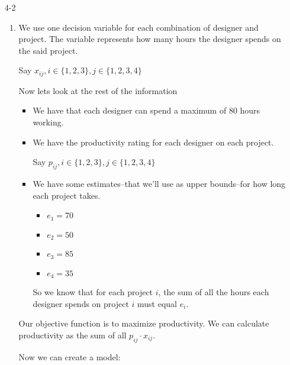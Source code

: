 \documentclass[12pt,letterpaper]{article}
\begin{document}
\begin{enumerate}
\begin{enumerate}
          

        \item
        \item
      \end{enumerate}

    \item [4-2]
      \begin{enumerate}
        \item
          We use one decision variable for each combination of designer and project.
          The variable represents how many hours the designer spends on the said project.

          Say $x_{ij}, i \in \{1, 2, 3\}, j \in \{1, 2, 3, 4\}$

          Now lets look at the rest of the information

          \begin{itemize}
            \item We have that each designer can spend a maximum of 80 hours working.
            \item
              We have the productivity rating for each designer on each project.

              Say $p_{ij}, i \in \{1, 2, 3\}, j \in \{1, 2, 3, 4\}$
            \item
              We have some estimates--that we'll use as upper bounds--for how long each project takes.
              \begin{itemize}
                \item $e_1 = 70$
                \item $e_2 = 50$
                \item $e_3 = 85$
                \item $e_4 = 35$
              \end{itemize}
              So we know that for each project $i$,
              the sum of all the hours each designer spends on project $i$ must equal $e_i$.
          \end{itemize}

          Our objective function is to maximize productivity.
          We can calculate productivity as the sum of all $p_{ij} \cdot x_{ij}$.

          Now we can create a model:


\end{enumerate}
\end{enumerate}
\end{document}
